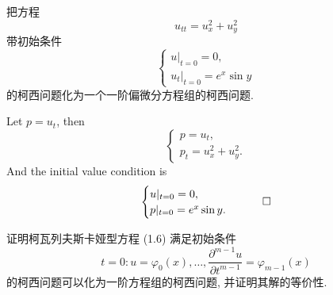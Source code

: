 \begin{exercise}
  把方程
  \[ u_{tt} = u_{x}^2 + u_{y}^2 \]
  带初始条件
  \[\begin{cases}
    u|_{t=0} = 0, \\
    u_t|_{t=0} = e^x \sin y
  \end{cases}\]
  的柯西问题化为一个一阶偏微分方程组的柯西问题.
\end{exercise}

\begin{solution}
  Let $p=u_t$, then
  \[\begin{cases}
    p = u_t, \\
    p_t = u_x^2 + u_y^2.
  \end{cases}\]
  And the initial value condition is
  \[\begin{cases}
    u|_{t=0} = 0, \\
    p|_{t=0} = e^x \sin y.
  \end{cases}\qedhere\]
\end{solution}


\begin{exercise}
  证明柯瓦列夫斯卡娅型方程 (1.6) 满足初始条件
  \begin{equation}
    t=0: u=\varphi_0(x),\ldots, \frac{\partial^{m-1}u}{\partial t^{m-1}} = \varphi_{m-1}(x) \tag{$\star$}
  \end{equation}
  的柯西问题可以化为一阶方程组的柯西问题, 并证明其解的等价性.
\end{exercise}

